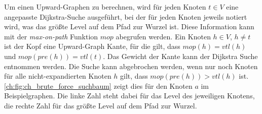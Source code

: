 Um einen Upward-Graphen zu berechnen, wird für jeden Knoten $t \in V$ eine angepasste Dijkstra-Suche ausgeführt, bei der für jeden Knoten jeweils notiert wird, was das größte Level auf dem Pfad zur Wurzel ist.
Diese Information kann mit der \emph{max-on-path} Funktion ${mop}$ abegrufen werden.
Ein Knoten $h \in V$, $h \neq t$ ist der Kopf eine Upward-Graph Kante, für die gilt, dass ${mop}(h) = {vtl}(h)$ und ${mop}({pre}(h)) = {vtl}(t)$.
Das Gewicht der Kante kann der Dijkstra Suche entnommen werden.
Die Suche kann abgebrochen werden, wenn nur noch Knoten für alle nicht-expandierten Knoten $h$ gilt, dass ${mop}({pre}(h)) > {vtl}(h)$ ist.
\autoref{ch:fig:ch_brute_force_suchbaum} zeigt dies für den Knoten $a$ im Beispielgraphen.
Die linke Zahl steht dabei für das Level des jeweiligen Knotens, die rechte Zahl für das größte Level auf dem Pfad zur Wurzel.

